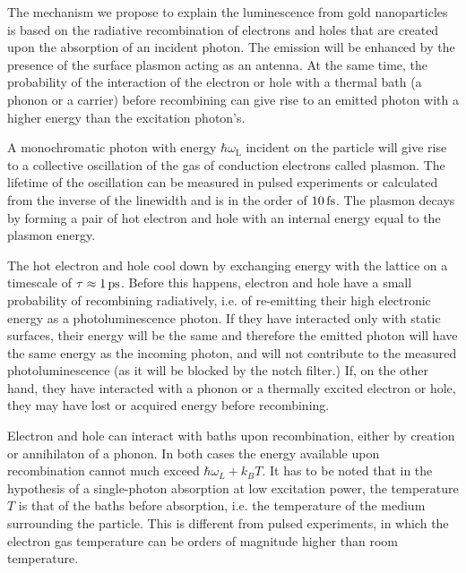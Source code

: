 The mechanism we propose to explain the luminescence from gold nanoparticles is
based on the radiative recombination of electrons and holes that are created
upon the absorption of an incident photon\cite{Dulkeith2004,Mooradian1969}. The
emission will be enhanced by the presence of the surface plasmon acting as an
antenna\cite{Mohamed2000}. At the same time, the probability of the interaction
of the electron or hole with a thermal bath (a phonon or a carrier) before
recombining can give rise to an emitted photon with a higher energy than the
excitation photon's\cite{Hodak2000,Giri2015,Arbouet2003a}.

A monochromatic photon with energy $\hbar\omega_\textrm{L}$ incident on the
particle will give rise to a collective oscillation of the gas of conduction
electrons called plasmon. The lifetime of the oscillation can be measured in
pulsed experiments or calculated from the inverse of the linewidth and is in the
order of $10\,\textrm{fs}$\cite{Sonnichsen2002}. The plasmon decays by forming a pair of
hot electron and hole with an internal energy equal to the plasmon
energy\cite{Sundararaman2014,Brongersma2015,AlejandroManjavacasJunG.LiuVikramKulkarni2014}.

The hot electron and hole cool down by exchanging energy with the lattice on a
timescale of $\tau\approx1\,\textrm{ps}$\cite{Pustovalov2005}. Before this happens,
electron and hole have a small probability of recombining radiatively, i.e. of 
re-emitting their high electronic energy as a photoluminescence photon. If they
have interacted only with static surfaces, their energy will be the same and
therefore the emitted photon will have the same energy as the incoming
photon, and will not contribute to the measured photoluminescence (as it will be
blocked by the notch filter.) If, on the other hand, they have interacted with a
phonon or a thermally excited electron or hole, they may have lost or acquired
energy before recombining.

Electron and hole can interact with baths upon recombination, either by
creation or annihilaton of a phonon. In both cases the energy available upon
recombination cannot much exceed $\hbar\omega_L+k_BT$. It has to be noted that
in the hypothesis of a single-photon absorption at low excitation power, the
temperature $T$ is that of the baths before absorption, i.e. the temperature of
the medium surrounding the particle. This is different from pulsed experiments,
in which the electron gas temperature can be orders of magnitude higher than
room temperature\cite{Baffou2013a}. 

